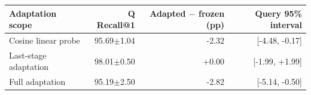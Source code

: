 \begin{tabular}{lrrr}
\toprule
Adaptation scope & Q Recall@1 & Adapted $-$ frozen (pp) & Query 95\% interval \\
\midrule
Cosine linear probe & 95.69$\pm$1.04 & -2.32 & [-4.48, -0.17] \\
Last-stage adaptation & 98.01$\pm$0.50 & +0.00 & [-1.99, +1.99] \\
Full adaptation & 95.19$\pm$2.50 & -2.82 & [-5.14, -0.50] \\
\bottomrule
\end{tabular}
